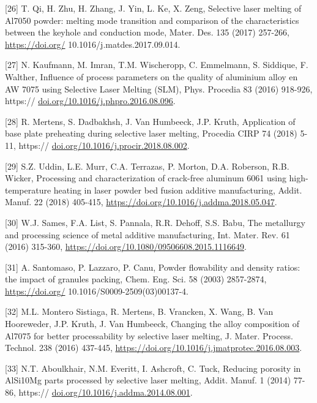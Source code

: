 \documentclass[10pt]{article}
\begin{document}
[26] T. Qi, H. Zhu, H. Zhang, J. Yin, L. Ke, X. Zeng, Selective laser melting of Al7050 powder: melting mode transition and comparison of the characteristics between the keyhole and conduction mode, Mater. Des. 135 (2017) 257-266, \href{https://doi.org/}{https://doi.org/} 10.1016/j.matdes.2017.09.014.

[27] N. Kaufmann, M. Imran, T.M. Wischeropp, C. Emmelmann, S. Siddique, F. Walther, Influence of process parameters on the quality of aluminium alloy en AW 7075 using Selective Laser Melting (SLM), Phys. Procedia 83 (2016) 918-926, https:// \href{http://doi.org/10.1016/j.phpro.2016.08.096}{doi.org/10.1016/j.phpro.2016.08.096}.

[28] R. Mertens, S. Dadbakhsh, J. Van Humbeeck, J.P. Kruth, Application of base plate preheating during selective laser melting, Procedia CIRP 74 (2018) 5-11, https:// \href{http://doi.org/10.1016/j.procir.2018.08.002}{doi.org/10.1016/j.procir.2018.08.002}.

[29] S.Z. Uddin, L.E. Murr, C.A. Terrazas, P. Morton, D.A. Roberson, R.B. Wicker, Processing and characterization of crack-free aluminum 6061 using high-temperature heating in laser powder bed fusion additive manufacturing, Addit. Manuf. 22 (2018) 405-415, \href{https://doi.org/10.1016/j.addma.2018.05.047}{https://doi.org/10.1016/j.addma.2018.05.047}.

[30] W.J. Sames, F.A. List, S. Pannala, R.R. Dehoff, S.S. Babu, The metallurgy and processing science of metal additive manufacturing, Int. Mater. Rev. 61 (2016) 315-360, \href{https://doi.org/10.1080/09506608.2015.1116649}{https://doi.org/10.1080/09506608.2015.1116649}.

[31] A. Santomaso, P. Lazzaro, P. Canu, Powder flowability and density ratios: the impact of granules packing, Chem. Eng. Sci. 58 (2003) 2857-2874, \href{https://doi.org/}{https://doi.org/} 10.1016/S0009-2509(03)00137-4.

[32] M.L. Montero Sistiaga, R. Mertens, B. Vrancken, X. Wang, B. Van Hooreweder, J.P. Kruth, J. Van Humbeeck, Changing the alloy composition of Al7075 for better processability by selective laser melting, J. Mater. Process. Technol. 238 (2016) 437-445, \href{https://doi.org/10.1016/j.jmatprotec.2016.08.003}{https://doi.org/10.1016/j.jmatprotec.2016.08.003}.

[33] N.T. Aboulkhair, N.M. Everitt, I. Ashcroft, C. Tuck, Reducing porosity in AlSi10Mg parts processed by selective laser melting, Addit. Manuf. 1 (2014) 77-86, https:// \href{http://doi.org/10.1016/j.addma.2014.08.001}{doi.org/10.1016/j.addma.2014.08.001}.
\end{document}
